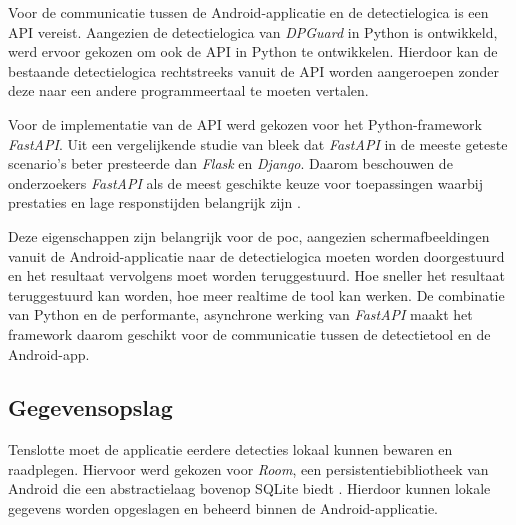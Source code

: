 \vspace{1em}

Voor de communicatie tussen de Android-applicatie en de detectielogica is een API vereist. Aangezien de detectielogica van \textit{DPGuard} in Python is ontwikkeld, werd ervoor gekozen om ook de API in Python te ontwikkelen. Hierdoor kan de bestaande detectielogica rechtstreeks vanuit de API worden aangeroepen zonder deze naar een andere programmeertaal te moeten vertalen.

\vspace{1em}

Voor de implementatie van de API werd gekozen voor het Python-framework \textit{FastAPI}. Uit een vergelijkende studie van \textcite{Bednarz2025} bleek dat \textit{FastAPI} in de meeste geteste scenario's beter presteerde dan \textit{Flask} en \textit{Django}. Daarom beschouwen de onderzoekers \textit{FastAPI} als de meest geschikte keuze voor toepassingen waarbij prestaties en lage responstijden belangrijk zijn \autocite{Bednarz2025}.

\vspace{1em}

Deze eigenschappen zijn belangrijk voor de \acrshort{poc}, aangezien schermafbeeldingen vanuit de Android-applicatie naar de detectielogica moeten worden doorgestuurd en het resultaat vervolgens moet worden teruggestuurd. Hoe sneller het resultaat teruggestuurd kan worden, hoe meer realtime de tool kan werken. De combinatie van Python en de performante, asynchrone werking van \textit{FastAPI} maakt het framework daarom geschikt voor de communicatie tussen de detectietool en de Android-app.

\vspace{1em}

\subsection{Gegevensopslag}
\label{subsec:gegevensopslag}

\vspace{1em}

Tenslotte moet de applicatie eerdere detecties lokaal kunnen bewaren en raadplegen. Hiervoor werd gekozen voor \textit{Room}, een persistentiebibliotheek van Android die een abstractielaag bovenop SQLite biedt \autocite{AndroidDevelopersRoom}. Hierdoor kunnen lokale gegevens worden opgeslagen en beheerd binnen de Android-applicatie.

\vspace{1em}

